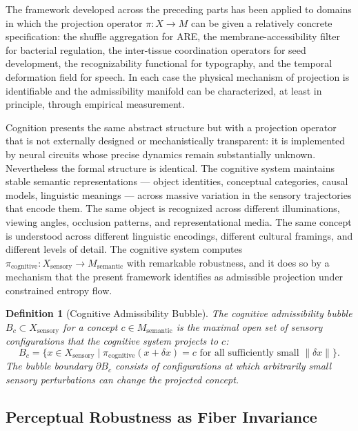 \documentclass[12pt, a4paper]{article}
\theoremstyle{essaystyle}
\newtheorem{definition}{Definition}
\begin{document}
The framework developed across the preceding parts has been applied to domains in
which the projection operator $\pi : X \to M$ can be given a relatively concrete
specification: the shuffle aggregation for ARE, the membrane-accessibility filter for
bacterial regulation, the inter-tissue coordination operators for seed development,
the recognizability functional for typography, and the temporal deformation field for
speech. In each case the physical mechanism of projection is identifiable and the
admissibility manifold can be characterized, at least in principle, through empirical
measurement.

Cognition presents the same abstract structure but with a projection operator that
is not externally designed or mechanistically transparent: it is implemented by neural
circuits whose precise dynamics remain substantially unknown. Nevertheless the formal
structure is identical. The cognitive system maintains stable semantic representations
--- object identities, conceptual categories, causal models, linguistic meanings ---
across massive variation in the sensory trajectories that encode them. The same object
is recognized across different illuminations, viewing angles, occlusion patterns, and
representational media. The same concept is understood across different linguistic
encodings, different cultural framings, and different levels of detail. The cognitive
system computes $\pi_{\mathrm{cognitive}} : X_{\mathrm{sensory}} \to M_{\mathrm{semantic}}$
with remarkable robustness, and it does so by a mechanism that the present framework
identifies as admissible projection under constrained entropy flow.

\begin{definition}[Cognitive Admissibility Bubble]
The \emph{cognitive admissibility bubble} $B_c \subset X_{\mathrm{sensory}}$ for
a concept $c \in M_{\mathrm{semantic}}$ is the maximal open set of sensory
configurations that the cognitive system projects to $c$:
\[
B_c = \bigl\{ x \in X_{\mathrm{sensory}} \;\big|\;
\pi_{\mathrm{cognitive}}(x + \delta x) = c
\text{ for all sufficiently small } \|\delta x\| \bigr\}.
\]
The bubble boundary $\partial B_c$ consists of configurations at which arbitrarily
small sensory perturbations can change the projected concept.
\end{definition}

\subsection{Perceptual Robustness as Fiber Invariance}
\end{document}
